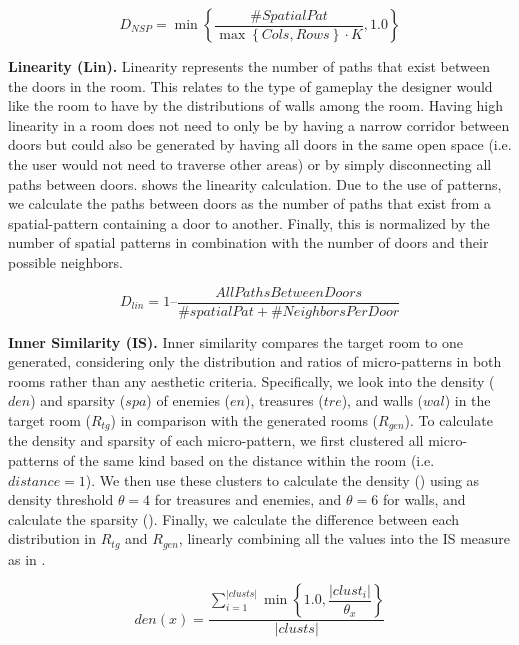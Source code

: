 \begin{equation} 
\label{eq:spatial-pat-eq}
D_{NSP} = \min\left\{\frac{\#SpatialPat}{\max\left\{{Cols, Rows}\right\} \cdot \textit{K}}, 1.0\right\}
\end{equation}

\textbf{Linearity (Lin).} Linearity represents the number of paths that exist between the doors in the room. This relates to the type of gameplay the designer would like the room to have by the distributions of walls among the room. Having high linearity in a room does not need to only be by having a narrow corridor between doors but could also be generated by having all doors in the same open space (i.e. the user would not need to traverse other areas) or by simply disconnecting all paths between doors.  shows the linearity calculation. Due to the use of patterns, we calculate the paths between doors as the number of paths that exist from a spatial-pattern containing a door to another. Finally, this is normalized by the number of spatial patterns in combination with the number of doors and their possible neighbors.

\begin{equation} \label{eq:Linearity-eq}
D_{lin} = 1 \text{--} \frac{AllPathsBetweenDoors} {\#spatialPat + \#NeighborsPerDoor}
\end{equation}


\textbf{Inner Similarity (IS).} Inner similarity compares the target room to one generated, considering only the distribution and ratios of micro-patterns in both rooms rather than any aesthetic criteria. Specifically, we look into the density ($den$) and sparsity ($spa$) of enemies ($en$), treasures ($tre$), and walls ($wal$) in the target room ($R_{tg}$) in comparison with the generated rooms ($R_{gen}$). To calculate the density and sparsity of each micro-pattern, we first clustered all micro-patterns of the same kind based on the distance within the room (i.e. $distance=1$). We then use these clusters to calculate the density () using as density threshold $\theta=4$ for treasures and enemies, and $\theta=6$ for walls, and calculate the sparsity (). Finally, we calculate the difference between each distribution in $R_{tg}$ and $R_{gen}$, linearly combining all the values into the IS measure as in .

\begin{equation} \label{eq:dens}
den(x)= \dfrac{\sum_{i=1}^{\left | clusts \right |}\min \left\{1.0, \dfrac{\left | clust_{i} \right |}{\theta_{x}}\right\}}{\left | clusts \right |}
\end{equation}

